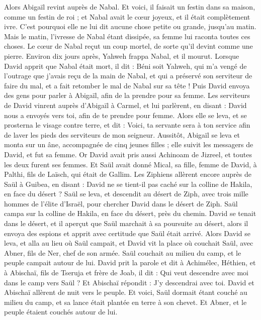 \begin{multicols}{2}
Alors Abigaïl revint auprès de Nabal. Et voici, il faisait un festin dans sa maison, comme un festin de roi ; et Nabal avait le cœur joyeux, et il était complètement ivre. C'est pourquoi elle ne lui dit aucune chose petite ou grande, jusqu'au matin.
Mais le matin, l'ivresse de Nabal étant dissipée, sa femme lui raconta toutes ces choses. Le cœur de Nabal reçut un coup mortel, de sorte qu'il devint comme une pierre.
Environ dix jours après, Yahweh frappa Nabal, et il mourut.
Lorsque David apprit que Nabal était mort, il dit : Béni soit Yahweh, qui m'a vengé de l'outrage que j'avais reçu de la main de Nabal, et qui a préservé son serviteur de faire du mal, et a fait retomber le mal de Nabal sur sa tête ! Puis David envoya des gens pour parler à Abigaïl, afin de la prendre pour sa femme.
Les serviteurs de David vinrent auprès d'Abigaïl à Carmel, et lui parlèrent, en disant : David nous a envoyés vers toi, afin de te prendre pour femme.
Alors elle se leva, et se prosterna le visage contre terre, et dit : Voici, ta servante sera à ton service afin de laver les pieds des serviteurs de mon seigneur.
Aussitôt, Abigaïl se leva et monta sur un âne, accompagnée de cinq jeunes filles ; elle suivit les messagers de David, et fut sa femme.
Or David avait pris aussi Achinoam de Jizreel, et toutes les deux furent ses femmes.
Et Saül avait donné Mical, sa fille, femme de David, à Palthi, fils de Laïsch, qui était de Gallim.
\VerseOne{}Les Ziphiens allèrent encore auprès de Saül à Guibea, en disant : David ne se tient-il pas caché sur la colline de Hakila, en face du désert ?
Saül se leva, et descendit au désert de Ziph, avec trois mille hommes de l'élite d'Israël, pour chercher David dans le désert de Ziph.
Saül campa sur la colline de Hakila, en face du désert, près du chemin. David se tenait dans le désert, et il aperçut que Saül marchait à sa poursuite au désert,
alors il envoya des espions et apprit avec certitude que Saül était arrivé.
Alors David se leva, et alla au lieu où Saül campait, et David vit la place où couchait Saül, avec Abner, fils de Ner, chef de son armée. Saül couchait au milieu du camp, et le peuple campait autour de lui.
David prit la parole et dit à Achimélec, Héthien, et à Abischaï, fils de Tseruja et frère de Joab, il dit : Qui veut descendre avec moi dans le camp vers Saül ? Et Abischaï répondit : J'y descendrai avec toi.
David et Abischaï allèrent de nuit vers le peuple. Et voici, Saül dormait étant couché au milieu du camp, et sa lance était plantée en terre à son chevet. Et Abner, et le peuple étaient couchés autour de lui.

\end{multicols}
